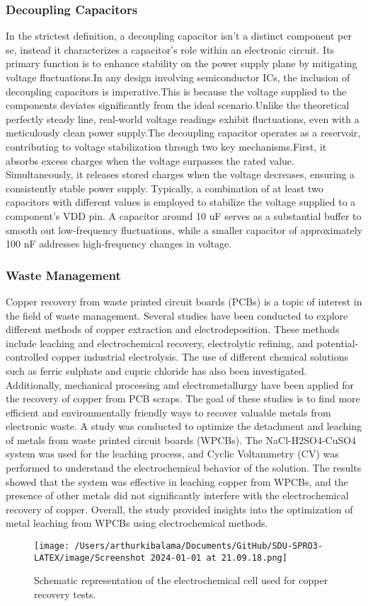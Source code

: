 \documentclass[../report.tex]{subfiles}
\begin{document}
  \subsubsection{Decoupling Capacitors}
  In the strictest definition, a decoupling capacitor isn't a distinct component per se, instead it characterizes a capacitor's role within an electronic circuit. 
  Its primary function is to enhance stability on the power supply plane by mitigating voltage fluctuations.In any design involving semiconductor ICs, the inclusion of decoupling capacitors is imperative.This is because the voltage supplied to the components deviates significantly from the ideal scenario.Unlike the theoretical perfectly steady line, real-world voltage readings exhibit fluctuations, even with a meticulously clean power supply.The decoupling capacitor operates as a reservoir, contributing to voltage stabilization through two key mechanisms.First, it absorbs excess charges when the voltage surpasses the rated value. Simultaneously, it releases stored charges when the voltage decreases, ensuring a consistently stable power supply.
  Typically, a combination of at least two capacitors with different values is employed to stabilize the voltage supplied to a component's VDD pin. A capacitor around 10 uF serves as a substantial buffer to smooth out low-frequency fluctuations, while a smaller capacitor of approximately 100 nF addresses high-frequency changes in voltage. 

\subsubsection{Waste Management}
Copper recovery from waste printed circuit boards (PCBs) is a topic of interest in the field of waste management. Several studies have been conducted to explore different methods of copper extraction and electrodeposition. These methods include leaching and electrochemical recovery, electrolytic refining, and potential-controlled copper industrial electrolysis. The use of different chemical solutions such as ferric sulphate and cupric chloride has also been investigated. Additionally, mechanical processing and electrometallurgy have been applied for the recovery of copper from PCB scraps. The goal of these studies is to find more efficient and environmentally friendly ways to recover valuable metals from electronic waste.
A study was conducted \cite{copper_recovery}  to optimize the detachment and leaching of metals from waste printed circuit boards (WPCBs). The NaCl-H2SO4-CuSO4 system was used for the leaching process, and Cyclic Voltammetry (CV) was performed to understand the electrochemical behavior of the solution. The results showed that the system was effective in leaching copper from WPCBs, and the presence of other metals did not significantly interfere with the electrochemical recovery of copper. Overall, the study provided insights into the optimization of metal leaching from WPCBs using electrochemical methods. 

\begin{figure}[H]
  \centering
  \texttt{[image: /Users/arthurkibalama/Documents/GitHub/SDU-SPRO3-LATEX/image/Screenshot 2024-01-01 at 21.09.18.png]}
  \caption{Schematic representation of the electrochemical cell used for copper recovery tests.}
\end{figure}   
\end{document}
